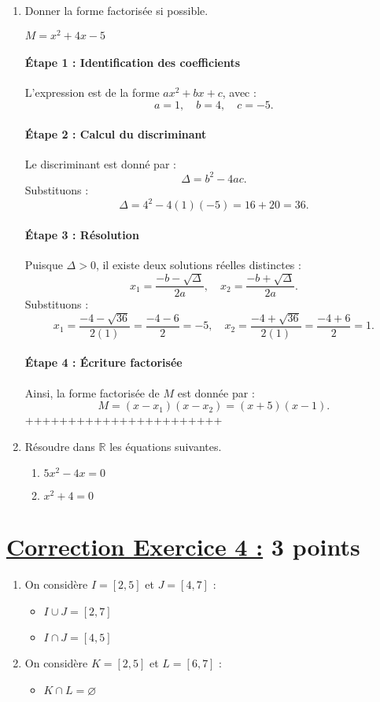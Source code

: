 \documentclass[12pt,a4paper]{article}
\begin{document}
\begin{enumerate}
\item Donner la forme factorisée si possible.

$M=x^{2}+4x-5$

\paragraph{Étape 1 : Identification des coefficients}
L'expression est de la forme \( ax^2 + bx + c \), avec :
\[
a = 1, \quad b = 4, \quad c = -5.
\]

\paragraph{Étape 2 : Calcul du discriminant}
Le discriminant est donné par :
\[
\Delta = b^2 - 4ac.
\]
Substituons :
\[
\Delta = 4^2 - 4(1)(-5) = 16 + 20 = 36.
\]

\paragraph{Étape 3 : Résolution}
Puisque \( \Delta > 0 \), il existe deux solutions réelles distinctes :
\[
x_1 = \frac{-b - \sqrt{\Delta}}{2a}, \quad x_2 = \frac{-b + \sqrt{\Delta}}{2a}.
\]
Substituons :
\[
x_1 = \frac{-4 - \sqrt{36}}{2(1)} = \frac{-4 - 6}{2} = -5, \quad x_2 = \frac{-4 + \sqrt{36}}{2(1)} = \frac{-4 + 6}{2} = 1.
\]

\paragraph{Étape 4 : Écriture factorisée}
Ainsi, la forme factorisée de \( M \) est donnée par :
\[
M = (x - x_1)(x - x_2) = (x + 5)(x - 1).
\]
+++++++++++++++++++++++
\item Résoudre dans $\mathbb{R}$ les équations suivantes.
\begin{enumerate}
\item $5x^{2}-4x = 0$
\item $x^{2}+4 = 0$
\end{enumerate}
\end{enumerate}

\section*{\underline{Correction Exercice 4 :} 3 points}
\begin{enumerate}
    \item On considère $I = [2, 5]$ et $J = [4, 7]$ :
    \begin{itemize}
        \item $I \cup J = [2, 7]$
        \item $I \cap J = [4, 5]$
    \end{itemize}

    \item On considère $K = [2, 5]$ et $L = [6, 7]$ :
    \begin{itemize}
        \item $K \cap L = \varnothing$
    \end{itemize}
\end{enumerate}
\end{document}
